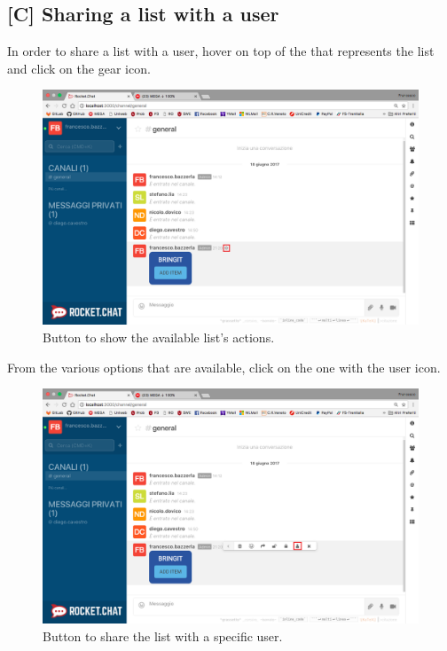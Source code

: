 \newpage
\subsection{[C] Sharing a list with a user}
In order to share a list with a user, hover on top of the  that represents the list and click on the gear icon.

\begin{figure}[H]
  \centering 
  \includegraphics[width=\textwidth]{Sections/3-HowToUse/Images/bubble_options_button.png}
  \caption{Button to show the available list's actions.}
\end{figure}

From the various options that are available, click on the one with the user icon.

\begin{figure}[H]
  \centering 
  \includegraphics[width=\textwidth]{Sections/3-HowToUse/Images/bubble_option_share_user.png}
  \caption{Button to share the list with a specific user.}
\end{figure}

